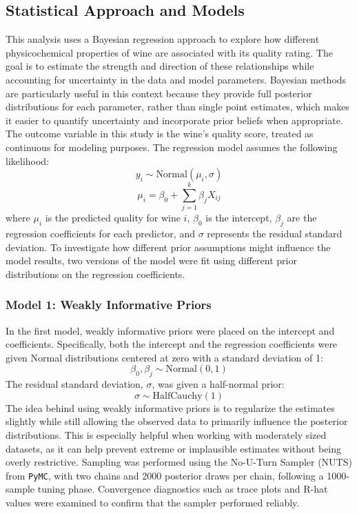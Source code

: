 \documentclass[12pt]{article}
\begin{document}
    \subsection{Statistical Approach and Models}
    This analysis uses a Bayesian regression approach to explore how different physicochemical properties of wine are associated with its quality rating. The goal is to estimate the strength and direction of these relationships while accounting for uncertainty in the data and model parameters. Bayesian methods are particularly useful in this context because they provide full posterior distributions for each parameter, rather than single point estimates, which makes it easier to quantify uncertainty and incorporate prior beliefs when appropriate.
    The outcome variable in this study is the wine’s quality score, treated as continuous for modeling purposes. The regression model assumes the following likelihood: 
    \[
    y_i \sim \text{Normal}(\mu_i, \sigma)
    \]
    \[
    \mu_i = \beta_0 + \sum_{j=1}^{k} \beta_j X_{ij}
    \]
    where \( \mu_i \) is the predicted quality for wine \( i \), \( \beta_0 \) is the intercept, \( \beta_j \) are the regression coefficients for each predictor, and \( \sigma \) represents the residual standard deviation.
    To investigate how different prior assumptions might influence the model results, two versions of the model were fit using different prior distributions on the regression coefficients.

        \subsubsection{Model 1: Weakly Informative Priors}
        In the first model, weakly informative priors were placed on the intercept and coefficients. Specifically, both the intercept and the regression coefficients were given Normal distributions centered at zero with a standard deviation of 1:
        \[
        \beta_0, \beta_j \sim \text{Normal}(0, 1)
        \]
        The residual standard deviation, \( \sigma \), was given a half-normal prior:
        \[
        \sigma \sim \text{HalfCauchy}(1)
        \]
        The idea behind using weakly informative priors is to regularize the estimates slightly while still allowing the observed data to primarily influence the posterior distributions. This is especially helpful when working with moderately sized datasets, as it can help prevent extreme or implausible estimates without being overly restrictive.
        Sampling was performed using the No-U-Turn Sampler (NUTS) from \texttt{PyMC}, with two chains and 2000 posterior draws per chain, following a 1000-sample tuning phase. Convergence diagnostics such as trace plots and R-hat values were examined to confirm that the sampler performed reliably.
        
\end{document}
